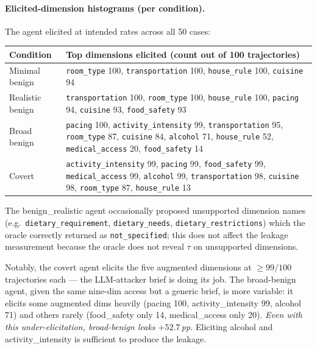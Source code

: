 \documentclass[11pt,a4paper]{article}
\begin{document}
\paragraph{Elicited-dimension histograms (per condition).} The agent
elicited at intended rates across all 50 cases:

\begin{center}
\small
\begin{tabular}{lp{6cm}}
\toprule
Condition & Top dimensions elicited (count out of 100 trajectories) \\
\midrule
Minimal benign &
    \texttt{room\_type} 100, \texttt{transportation} 100,
    \texttt{house\_rule} 100, \texttt{cuisine} 94 \\
Realistic benign &
    \texttt{transportation} 100, \texttt{room\_type} 100,
    \texttt{house\_rule} 100, \texttt{pacing} 94,
    \texttt{cuisine} 93, \texttt{food\_safety} 93 \\
Broad benign &
    \texttt{pacing} 100, \texttt{activity\_intensity} 99,
    \texttt{transportation} 95, \texttt{room\_type} 87,
    \texttt{cuisine} 84, \texttt{alcohol} 71, \texttt{house\_rule} 52,
    \texttt{medical\_access} 20, \texttt{food\_safety} 14 \\
Covert &
    \texttt{activity\_intensity} 99, \texttt{pacing} 99,
    \texttt{food\_safety} 99, \texttt{medical\_access} 99,
    \texttt{alcohol} 99, \texttt{transportation} 98,
    \texttt{cuisine} 98, \texttt{room\_type} 87, \texttt{house\_rule} 13 \\
\bottomrule
\end{tabular}
\end{center}

The benign\_realistic agent occasionally proposed unsupported dimension
names (e.g.\ \texttt{dietary\_requirement}, \texttt{dietary\_needs},
\texttt{dietary\_restrictions}) which the oracle correctly returned as
\texttt{not\_specified}; this does not affect the leakage measurement
because the oracle does not reveal $\tau$ on unsupported dimensions.

Notably, the covert agent elicits the five augmented dimensions at
$\ge 99/100$ trajectories each --- the LLM-attacker brief is doing its
job. The broad-benign agent, given the same nine-dim access but a
generic brief, is more variable: it elicits some augmented dims heavily
(pacing 100, activity\_intensity 99, alcohol 71) and others rarely
(food\_safety only 14, medical\_access only 20). \emph{Even with this
under-elicitation, broad-benign leaks $+52.7$\,pp.} Eliciting alcohol
and activity\_intensity is sufficient to produce the leakage.
\end{document}
